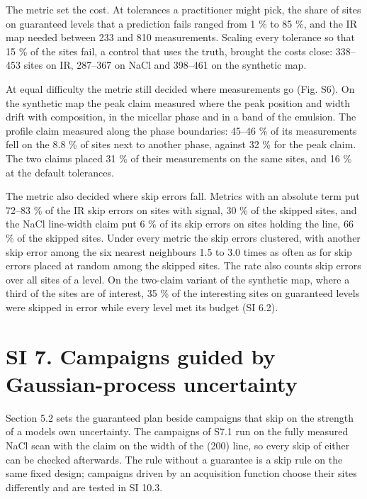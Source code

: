 \documentclass{iopjournal}
\begin{document}
The metric set the cost. At tolerances a practitioner might pick, the share of sites on guaranteed levels that a prediction fails ranged from 1 \% to 85 \%, and the IR map needed between 233 and 810 measurements. Scaling every tolerance so that 15 \% of the sites fail, a control that uses the truth, brought the costs close: 338--453 sites on IR, 287--367 on NaCl and 398--461 on the synthetic map.

At equal difficulty the metric still decided where measurements go (Fig. S6). On the synthetic map the peak claim measured where the peak position and width drift with composition, in the micellar phase and in a band of the emulsion. The profile claim measured along the phase boundaries: 45--46 \% of its measurements fell on the 8.8 \% of sites next to another phase, against 32 \% for the peak claim. The two claims placed 31 \% of their measurements on the same sites, and 16 \% at the default tolerances.

The metric also decided where skip errors fall. Metrics with an absolute term put 72--83 \% of the IR skip errors on sites with signal, 30 \% of the skipped sites, and the NaCl line-width claim put 6 \% of its skip errors on sites holding the line, 66 \% of the skipped sites. Under every metric the skip errors clustered, with another skip error among the six nearest neighbours 1.5 to 3.0 times as often as for skip errors placed at random among the skipped sites. The rate also counts skip errors over all sites of a level. On the two-claim variant of the synthetic map, where a third of the sites are of interest, 35 \% of the interesting sites on guaranteed levels were skipped in error while every level met its budget (SI 6.2).

\hypertarget{si-7.-campaigns-guided-by-gaussian-process-uncertainty}{%
\section*{SI 7. Campaigns guided by Gaussian-process uncertainty}\label{si-7.-campaigns-guided-by-gaussian-process-uncertainty}}

Section 5.2 sets the guaranteed plan beside campaigns that skip on the strength of a model\textquotesingle s own uncertainty. The campaigns of S7.1 run on the fully measured NaCl scan with the claim on the width of the (200) line, so every skip of either can be checked afterwards. The rule without a guarantee is a skip rule on the same fixed design; campaigns driven by an acquisition function choose their sites differently and are tested in SI 10.3.
\end{document}
